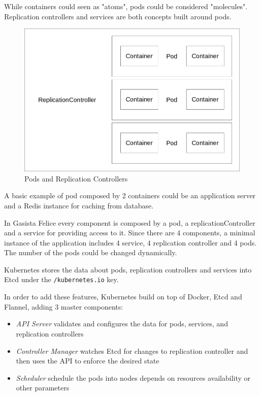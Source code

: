 While containers could seen as "atoms", pods could be considered "molecules".  Replication controllers and services are both concepts built around pods.

\begin{figure}[htbp]
\centering
\includegraphics{media/ch5-pods-rcs.png}
\caption{Pods and Replication Controllers}
\end{figure}

A basic example of pod composed by 2 containers could be an application server and a Redis instance for caching from database.

In Gasista Felice every component is composed by a pod, a replicationController and a service for providing access to it.  Since there are 4 components, a minimal instance of the application includes 4 service, 4 replication controller and 4 pods.  The number of the pods could be changed dynamically.

Kubernetes stores the data about pods, replication controllers and services into Etcd under the \texttt{/kubernetes.io} key.

In order to add these features, Kubernetes build on top of Docker, Etcd and Flannel, adding 3 master components:

\begin{itemize}
\item \textit{API Server} validates and configures the data for pods, services, and replication controllers
\item \textit{Controller Manager} watches Etcd for changes to replication controller and then uses the API to enforce the desired state
\item \textit{Scheduler} schedule the pods into nodes depends on resources availability or other parameters
\end{itemize}

